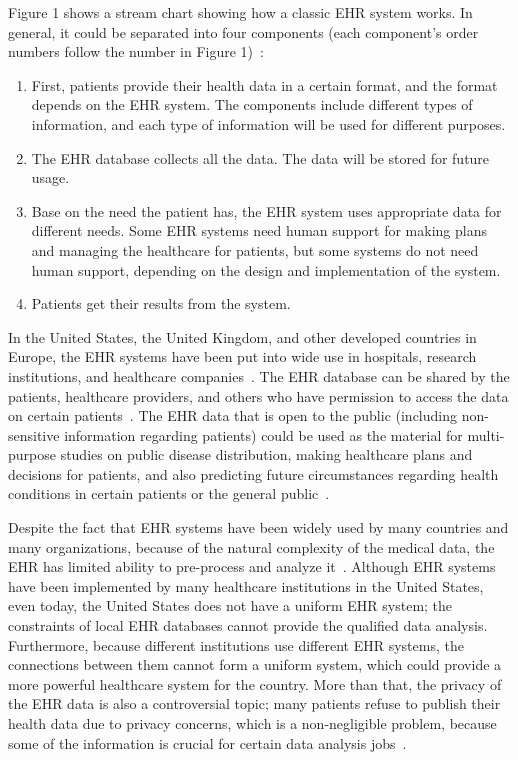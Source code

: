 Figure 1 shows a stream chart showing how a classic EHR system works. In 
general, it could be separated into four components (each component's 
order numbers follow the number in Figure 1)~\cite{EHR}:
\begin{enumerate}
	\item First, patients provide their health data in a certain format,
	 and the format depends on the EHR system. The components include 
	 different types of information, and each type of 
	 information will be used for 
	 different purposes.
	\item The EHR database collects all the data. 
	The data will be stored for 
	future usage.
	\item Base on the need the patient has, the EHR system 
	uses appropriate data 
	for different needs. Some EHR systems need human 
	support for making 
	plans and managing the healthcare for patients, 
	but some systems do not 
	need human support, depending on the design 
	and implementation of 
	the system.
	\item Patients get their results from the system.
\end{enumerate}

In the United States, the United Kingdom, and other developed countries in 
Europe, 
the EHR systems have been put into wide use in hospitals, research 
institutions, and healthcare companies~\cite{Ross2014}. The EHR database 
can be shared by the patients, healthcare providers, and others who have 
permission to access the data on certain patients~\cite{Reddy2013}. The 
EHR data that is open to the public (including non-sensitive
 information regarding
patients) could be used as the material for multi-purpose studies on public 
disease distribution, making healthcare plans and decisions for patients, and 
also predicting future circumstances regarding health 
conditions in certain patients 
or the general public~\cite{Ross2014}. 

Despite the fact that EHR systems have been widely used by 
many countries and many 
organizations, because of the natural complexity of the medical data, the 
EHR has limited ability to pre-process and 
analyze it~\cite{Ross2014}. Although EHR systems have been 
implemented by 
many healthcare institutions in the United States, even today, 
the United States 
does not have a uniform EHR system; the constraints of local EHR 
databases cannot provide the qualified data analysis. 
Furthermore, because different institutions use different 
EHR systems, the connections between 
them cannot form a uniform system, which could provide a more powerful 
healthcare system for the country. More than that, the privacy of the EHR 
data is also a controversial topic; many patients refuse to 
publish their health data due to privacy concerns, which is a 
non-negligible problem, because some of the information is crucial for 
certain data analysis jobs~\cite{Ross2014}.

